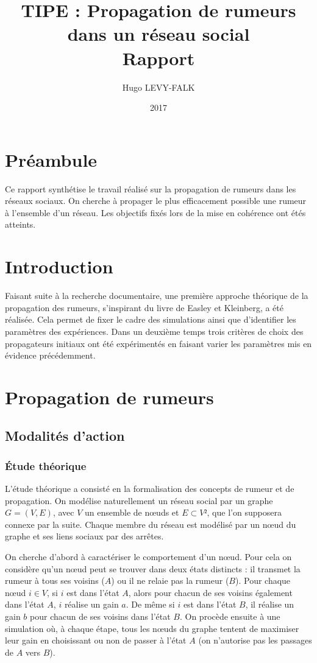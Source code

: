 \documentclass{article}
\title{TIPE : Propagation de rumeurs dans un réseau social\\Rapport}
\author{Hugo LEVY-FALK}
\date{2017}
\begin{document}
\maketitle
{}\;
\tableofcontents
\newpage

\section{Préambule}
Ce rapport synthétise le travail réalisé sur la propagation de rumeurs dans les réseaux sociaux. On cherche à propager le plus efficacement possible une rumeur à l'ensemble d'un réseau. Les objectifs fixés lors de la mise en cohérence ont étés atteints.

\section{Introduction}
Faisant suite à la recherche documentaire, une première approche théorique de la propagation des rumeurs, s'inspirant du livre de Easley et Kleinberg, a été réalisée. Cela permet de fixer le cadre des simulations ainsi que d'identifier les paramètres des expériences. Dans un deuxième temps trois critères de choix des propagateurs initiaux ont été expérimentés en faisant varier les paramètres mis en évidence précédemment.

\section{Propagation de rumeurs}
\subsection{Modalités d'action}
\subsubsection{Étude théorique}
L'étude théorique a consisté en la formalisation des concepts de rumeur et de propagation. On modélise naturellement un réseau social par un graphe $G = (V,E)$, avec $V$ un ensemble de nœuds et $E\subset V²$, que l'on supposera connexe par la suite. Chaque membre du réseau est modélisé par un nœud du graphe et ses liens sociaux par des arrêtes.

On cherche d'abord à caractériser le comportement d'un nœud. Pour cela on considère qu'un nœud peut se trouver dans deux états distincts : il transmet la rumeur à tous ses voisins ($A$) ou il ne relaie pas la rumeur ($B$). Pour chaque nœud $i\in V$, si $i$ est dans l'état $A$, alors pour chacun de ses voisins également dans l'état $A$, $i$ réalise un gain $a$. De même si $i$ est dans l'état $B$, il réalise un gain $b$ pour chacun de ses voisins dans l'état $B$. On procède ensuite à une simulation où, à chaque étape, tous les nœuds du graphe tentent de maximiser leur gain en choisissant ou non de passer à l'état $A$ (on n'autorise pas les passages de $A$ vers $B$).
\end{document}
